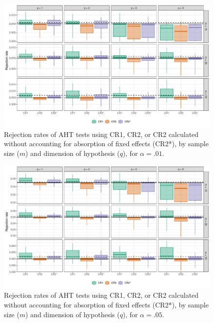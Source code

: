 \documentclass[12pt]{article}
\begin{document}
\begin{landscape}
\begin{figure}[H]

{\centering \includegraphics[width=\linewidth]{CR_fig/absorption_01-1} 

}

\caption{Rejection rates of AHT tests using CR1, CR2, or CR2 calculated without accounting for absorption of fixed effects (CR2*), by sample size ($m$) and dimension of hypothesis ($q$), for $\alpha = .01$.}\label{fig:absorption_01}
\end{figure}

\begin{figure}[H]

{\centering \includegraphics[width=\linewidth]{CR_fig/absorption_05-1} 

}

\caption{Rejection rates of AHT tests using CR1, CR2, or CR2 calculated without accounting for absorption of fixed effects (CR2*), by sample size ($m$) and dimension of hypothesis ($q$), for $\alpha = .05$.}\label{fig:absorption_05}
\end{figure}


\end{landscape}
\end{document}
